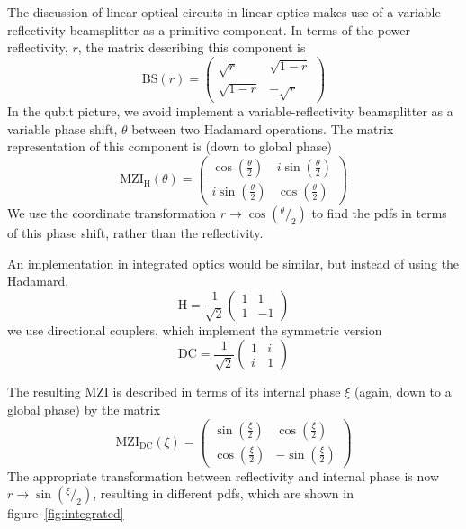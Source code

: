 \documentclass[aps,prl,twocolumn,floatfix]{revtex4}
\newcommand{\mat}[1]{\mathrm{#1}}
\newcommand{\of}[1]{\!\left(#1\right)}
\newcommand{\pdf}{{pdf}}
\begin{document}
The discussion of linear optical circuits in linear optics makes use of a
variable reflectivity beamsplitter as a primitive component. In terms of the
power reflectivity, \(r\), the matrix describing this component is
\begin{equation}
  \mat{BS} \of{r} = \begin{pmatrix}
    \sqrt{r} & \sqrt{1-r} \\
    \sqrt{1-r} & -\sqrt{r}
  \end{pmatrix}
\end{equation}
In the qubit picture, we avoid implement a variable-reflectivity beamsplitter as
a variable phase shift, \(\theta\) between two Hadamard operations. The matrix
representation of this component is (down to global phase)
\begin{equation}
  \mat{MZI}_{\mat{H}} \of{\theta} = \begin{pmatrix}
    \cos \of{ \frac{\theta}{2} } & i \sin \of{ \frac{\theta}{2} } \\
    i \sin \of{ \frac{\theta}{2} } & \cos \of{ \frac{\theta}{2} }
  \end{pmatrix}
\end{equation}
We use the coordinate transformation \( r \rightarrow \cos \of{ ^{\theta}/_{2}}
\) to find the \pdf{}s in terms of this phase shift, rather than the
reflectivity.

An implementation in integrated optics would be similar, but instead of using
the Hadamard,
\begin{equation}
  \mat{H} = \frac{1}{\sqrt{2}} \begin{pmatrix}
    1 & 1 \\
    1 & -1
  \end{pmatrix}
\end{equation}
we use directional couplers, which implement the symmetric version
\begin{equation}
  \mat{DC} = \frac{1}{\sqrt{2}} \begin{pmatrix}
    1 & i \\
    i & 1
  \end{pmatrix}
\end{equation}

The resulting MZI is described in terms of its internal phase \(\xi\) (again,
down to a global phase) by the matrix
\begin{equation}
  \mat{MZI}_{\mat{DC}} \of{\xi} = \begin{pmatrix}
    \sin \of{ \frac{\xi}{2} } & \cos \of{ \frac{\xi}{2} } \\
    \cos \of{ \frac{\xi}{2} } & -\sin \of{ \frac{\xi}{2} }
  \end{pmatrix}
\end{equation}
The appropriate transformation between reflectivity and internal phase is now
\(r \rightarrow \sin \of{^{\xi}/_{2}} \), resulting in different \pdf{}s, which
are shown in figure~\ref{fig:integrated}
\end{document}

